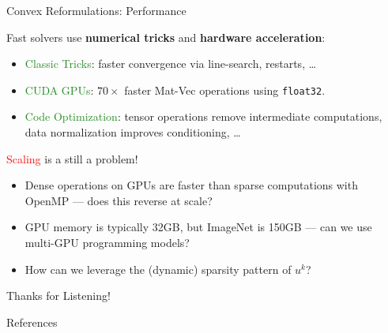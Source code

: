 \documentclass[usenames,dvipsnames,mathserif,notheorems]{beamer}
\begin{document}
\begin{frame}{Convex Reformulations: Performance}

	Fast solvers use \textbf{numerical tricks} and \textbf{hardware acceleration}:
	\vspace{1em}
	\begin{itemize}
		\item \textcolor{ForestGreen}{Classic Tricks}: faster convergence via line-search, restarts, \ldots
		\item \textcolor{ForestGreen}{CUDA GPUs}: \( 70\times \) faster Mat-Vec operations using \texttt{float32}.
		\item \textcolor{ForestGreen}{Code Optimization}: tensor operations remove intermediate computations,
		      data normalization improves conditioning, \ldots
	\end{itemize}
	\vspace{1em}

	\textcolor{red}{Scaling} is a still a problem!
	\begin{itemize}
		\item Dense operations on GPUs are faster than sparse computations with OpenMP --- does this reverse at scale?
		\item GPU memory is typically 32GB, but ImageNet is 150GB --- can we use multi-GPU programming models?
		\item How can we leverage the (dynamic) sparsity pattern of \( u^k \)?
	\end{itemize}

\end{frame}



\begin{frame}{}
	\begin{center}
		\huge Thanks for Listening!
	\end{center}
\end{frame}

\begin{frame}[allowframebreaks]{References}
	\printbibliography[]
\end{frame}
\end{document}
